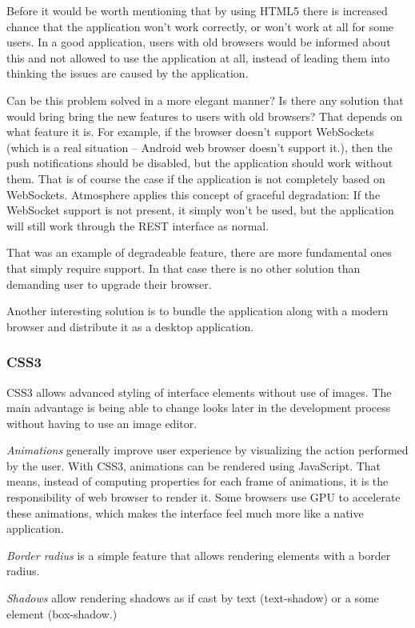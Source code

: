 Before it would be worth mentioning that by using HTML5 there is increased chance that the application won’t work correctly, or won’t work at all for some users. In a good application, users with old browsers would be informed about this and not allowed to use the application at all, instead of leading them into thinking the issues are caused by the application. 

Can be this problem solved in a more elegant manner? Is there any solution that would bring bring the new features to users with old browsers? That depends on what feature it is. For example, if the browser doesn’t support WebSockets (which is a real situation – Android web browser doesn’t support it.), then the push notifications should be disabled, but the application should work without them. That is of course the case if the application is not completely based on WebSockets. Atmosphere applies this concept of graceful degradation: If the WebSocket support is not present, it simply won’t be used, but the application will still work through the REST interface as normal.

That was an example of degradeable feature, there are more fundamental ones that simply require support. In that case there is no other solution than demanding user to upgrade their browser.

Another interesting solution is to bundle the application along with a modern browser and distribute it as a desktop application.

\subsubsection{CSS3}

CSS3 allows advanced styling of interface elements without use of images. The main advantage is being able to change looks later in the development process without having to use an image editor.

\emph{Animations} generally improve user experience by visualizing the action performed by the user. With CSS3, animations can be rendered using JavaScript. That means, instead of computing properties for each frame of animations, it is the responsibility of web browser to render it. Some browsers use GPU to accelerate these animations, which makes the interface feel much more like a native application. 

\emph{Border radius} is a simple feature that allows rendering elements with a border radius. 

\emph{Shadows} allow rendering shadows as if cast by text (text-shadow) or a some element (box-shadow.) 

